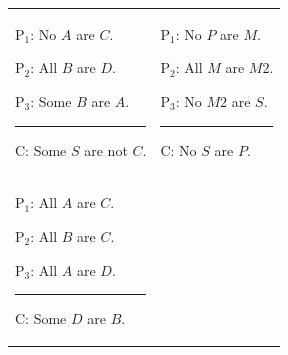 {\begin{exercises}
\begin{longtabu}{X[1,p,m]X[1,p,m]} 
\item \begin{earg}
\item[P$_1$:] No $A$ are $C$.
\item[P$_2$:] All $B$ are $D$.
\item[P$_3$:] Some $B$ are $A$.
\vspace{-.5em}
\item [] \rule{0.6\linewidth}{.5pt} 
\item[C:] Some $S$ are not $C$.
\end{earg} 
%
%
&
\item\begin{earg}
\item[P$_1$:] No $P$ are $M$.
\item[P$_2$:] All $M$ are $M2$.
\item[P$_3$:] No $M2$ are $S$.
\vspace{-.5em}
\item [] \rule{0.6\linewidth}{.5pt} 
\item[C:] No $S$ are $P$.
\end{earg}
%
%
\\
\item\begin{earg}
\item[P$_1$:] All $A$ are $C$.
\item[P$_2$:] All $B$ are $C$.
\item[P$_3$:] All $A$ are $D$.
\vspace{-.5em}
\item [] \rule{0.6\linewidth}{.5pt} 
\item[C:] Some $D$ are $B$.
\end{earg}



\end{longtabu}
\end{exercises}}
